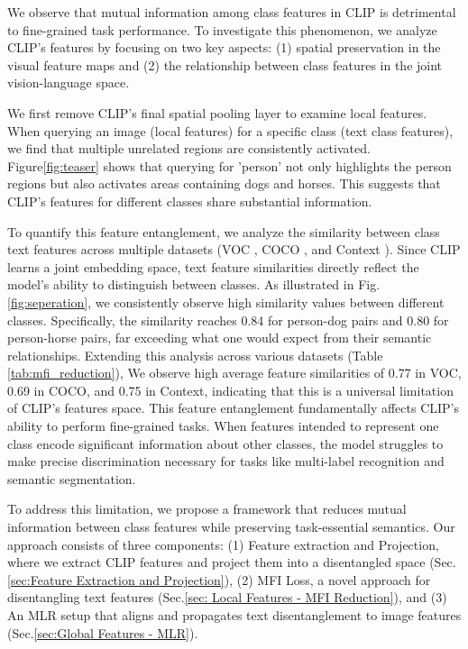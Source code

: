 We observe that mutual information among class features in CLIP is detrimental to fine-grained task performance. To investigate this phenomenon, we analyze CLIP's features by focusing on two key aspects: (1) spatial preservation in the visual feature maps and (2) the relationship between class features in the joint vision-language space.

We first remove CLIP's final spatial pooling layer to examine local features. When querying an image (local features) for a specific class (text class features), we find that multiple unrelated regions are consistently activated. Figure\ref{fig:teaser} shows that querying for 'person' not only highlights the person regions but also activates areas containing dogs and horses. This suggests that CLIP's features for different classes share substantial information.

To quantify this feature entanglement, we analyze the similarity between class text features across multiple datasets (VOC \cite{pascal-voc}, COCO \cite{coco}, and Context \cite{context}). Since CLIP learns a joint embedding space, text feature similarities directly reflect the model's ability to distinguish between classes. As illustrated in Fig.\ref{fig:seperation}, we consistently observe high similarity values between different classes. Specifically, the similarity reaches 0.84 for person-dog pairs and 0.80 for person-horse pairs, far exceeding what one would expect from their semantic relationships. Extending this analysis across various datasets (Table \ref{tab:mfi_reduction}), We observe high average feature similarities of 0.77 in VOC, 0.69 in COCO, and 0.75 in Context, indicating that this is a universal limitation of CLIP's features space. This feature entanglement fundamentally affects CLIP's ability to perform fine-grained tasks. When features intended to represent one class encode significant information about other classes, the model struggles to make precise discrimination necessary for tasks like multi-label recognition and semantic segmentation.

To address this limitation, we propose a framework that reduces mutual information between class features while preserving task-essential semantics. Our approach consists of three components: (1) Feature extraction and Projection, where we extract CLIP features and project them into a disentangled space (Sec.\ref{sec:Feature Extraction and Projection}),  (2) MFI Loss, a novel approach for disentangling text features (Sec.\ref{sec: Local Features - MFI Reduction}), and (3) An MLR setup that aligns and propagates text disentanglement to image features (Sec.\ref{sec:Global Features - MLR}).



